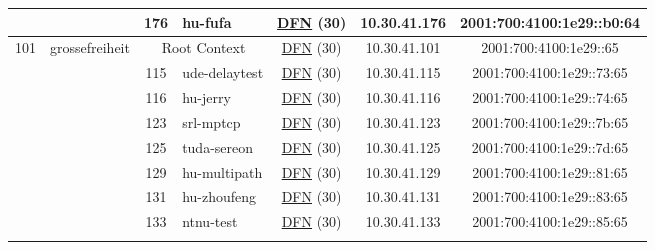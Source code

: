 \begin{small}
\begin{center}
\begin{longtable}{|c|c|c|c|c|c|c|c|}
  &  & \tiny{176} & \multicolumn{1}{|l|}{\tiny{hu-fufa}} & \multicolumn{2}{|c|}{\tiny{\href{https://www.dfn.de}{DFN} (30)}} & \tiny{10.30.41.176} & \tiny{2001:700:4100:1e29::b0:64} \\ \hline
 \multirow{29}{*}{\tiny{101}} & \multicolumn{1}{|l|}{\multirow{29}{*}{\tiny{grossefreiheit}}} & \multicolumn{2}{|c|}{\tiny{Root Context}} & \multicolumn{2}{|c|}{\tiny{\href{https://www.dfn.de}{DFN} (30)}} & \tiny{10.30.41.101} & \tiny{2001:700:4100:1e29::65} \\* \cline{3-3}\cline{4-4}\cline{5-5}\cline{6-6}\cline{7-7}\cline{8-8}
  &  & \tiny{115} & \multicolumn{1}{|l|}{\tiny{ude-delaytest}} & \multicolumn{2}{|c|}{\tiny{\href{https://www.dfn.de}{DFN} (30)}} & \tiny{10.30.41.115} & \tiny{2001:700:4100:1e29::73:65} \\* \cline{3-3}\cline{4-4}\cline{5-5}\cline{6-6}\cline{7-7}\cline{8-8}
  &  & \tiny{116} & \multicolumn{1}{|l|}{\tiny{hu-jerry}} & \multicolumn{2}{|c|}{\tiny{\href{https://www.dfn.de}{DFN} (30)}} & \tiny{10.30.41.116} & \tiny{2001:700:4100:1e29::74:65} \\* \cline{3-3}\cline{4-4}\cline{5-5}\cline{6-6}\cline{7-7}\cline{8-8}
  &  & \tiny{123} & \multicolumn{1}{|l|}{\tiny{srl-mptcp}} & \multicolumn{2}{|c|}{\tiny{\href{https://www.dfn.de}{DFN} (30)}} & \tiny{10.30.41.123} & \tiny{2001:700:4100:1e29::7b:65} \\* \cline{3-3}\cline{4-4}\cline{5-5}\cline{6-6}\cline{7-7}\cline{8-8}
  &  & \tiny{125} & \multicolumn{1}{|l|}{\tiny{tuda-sereon}} & \multicolumn{2}{|c|}{\tiny{\href{https://www.dfn.de}{DFN} (30)}} & \tiny{10.30.41.125} & \tiny{2001:700:4100:1e29::7d:65} \\* \cline{3-3}\cline{4-4}\cline{5-5}\cline{6-6}\cline{7-7}\cline{8-8}
  &  & \tiny{129} & \multicolumn{1}{|l|}{\tiny{hu-multipath}} & \multicolumn{2}{|c|}{\tiny{\href{https://www.dfn.de}{DFN} (30)}} & \tiny{10.30.41.129} & \tiny{2001:700:4100:1e29::81:65} \\* \cline{3-3}\cline{4-4}\cline{5-5}\cline{6-6}\cline{7-7}\cline{8-8}
  &  & \tiny{131} & \multicolumn{1}{|l|}{\tiny{hu-zhoufeng}} & \multicolumn{2}{|c|}{\tiny{\href{https://www.dfn.de}{DFN} (30)}} & \tiny{10.30.41.131} & \tiny{2001:700:4100:1e29::83:65} \\* \cline{3-3}\cline{4-4}\cline{5-5}\cline{6-6}\cline{7-7}\cline{8-8}
  &  & \tiny{133} & \multicolumn{1}{|l|}{\tiny{ntnu-test}} & \multicolumn{2}{|c|}{\tiny{\href{https://www.dfn.de}{DFN} (30)}} & \tiny{10.30.41.133} & \tiny{2001:700:4100:1e29::85:65} \\* \cline{3-3}\cline{4-4}\cline{5-5}\cline{6-6}\cline{7-7}\cline{8-8}

\end{longtable}
\end{center}
\end{small}
